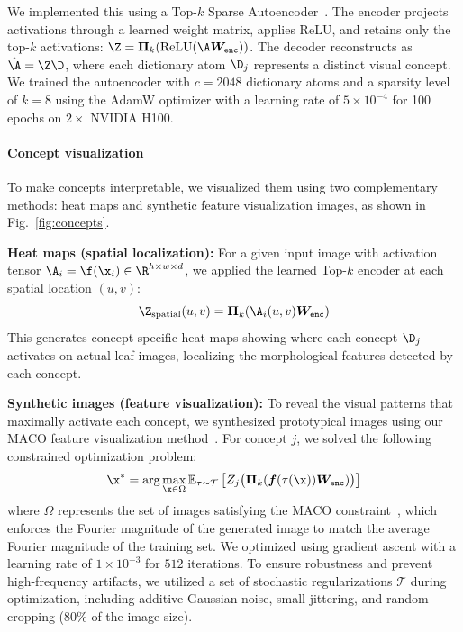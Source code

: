 \documentclass[pdflatex,lineno,sn-nature]{sn-jnl}%
\theoremstyle{plain}%
\theoremstyle{definition}%
\theoremstyle{remark}%
\begin{document}
We implemented this using a Top-$k$ Sparse Autoencoder~\citep{gao2024scaling,fel2025archetypal}. The encoder projects activations through a learned weight matrix, applies ReLU, and retains only the top-$k$ activations: $\Z = \bm{\Pi}_k(\text{ReLU}(\A\bm{W}_{\texttt{enc}}))$. The decoder reconstructs as $\hat{\A} = \Z\D$, where each dictionary atom $\D_j$ represents a distinct visual concept. We trained the autoencoder with $c = 2048$ dictionary atoms and a sparsity level of $k = 8$ using the AdamW optimizer with a learning rate of $5 \times 10^{-4}$ for 100 epochs on $2\times$ NVIDIA H100. 

\paragraph{Concept visualization}
To make concepts interpretable, we visualized them using two complementary methods: heat maps and synthetic feature visualization images, as shown in Fig.~\ref{fig:concepts}.

\textbf{Heat maps (spatial localization):} For a given input image with activation tensor $\A_i = \f(\x_i) \in \R^{h \times w \times d}$, we applied the learned Top-$k$ encoder at each spatial location $(u,v)$:
\[
\Z_{\text{spatial}}(u,v) = \bm{\Pi}_k(\A_i(u,v) \bm{W}_{\texttt{enc}})
\]
This generates concept-specific heat maps showing where each concept $\D_j$ activates on actual leaf images, localizing the morphological features detected by each concept.

\textbf{Synthetic images (feature visualization):} To reveal the visual patterns that maximally activate each concept, we synthesized prototypical images using our MACO feature visualization method~\citep{fel2023unlocking}. For concept $j$, we solved the following constrained optimization problem:
\[
\x^* = \arg\max_{\x \in \Omega} \mathbb{E}_{\tau \sim \mathcal{T}} \left[ Z_j\big( \bm{\Pi}_k(\bm{f}(\tau(\x)) \bm{W}_{\texttt{enc}}) \big) \right]
\]
where $\Omega$ represents the set of images satisfying the MACO constraint~\citep{fel2023unlocking}, which enforces the Fourier magnitude of the generated image to match the average Fourier magnitude of the training set. We optimized using gradient ascent with a learning rate of $1\times 10^{-3}$ for $512$ iterations. To ensure robustness and prevent high-frequency artifacts, we utilized a set of stochastic regularizations $\mathcal{T}$ during optimization, including additive Gaussian noise, small jittering, and random cropping (80\% of the image size).
\end{document}
